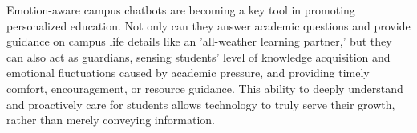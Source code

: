 \documentclass{xum_review}
\begin{document}
Emotion-aware campus chatbots are becoming a key tool in promoting personalized
education. Not only can they answer academic questions and provide guidance on
campus life details like an 'all-weather learning partner,' but they can also
act as guardians, sensing students' level of knowledge acquisition and emotional
fluctuations caused by academic pressure, and providing timely comfort,
encouragement, or resource guidance. This ability to deeply understand and
proactively care for students allows technology to truly serve their growth,
rather than merely conveying information.


\end{document}
